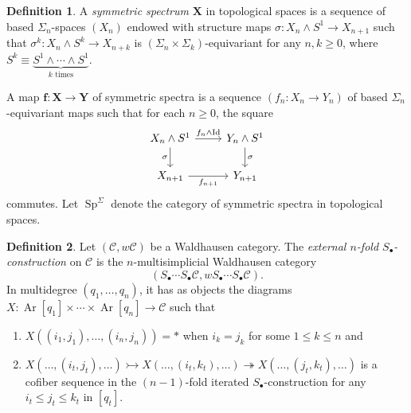 \documentclass[10pt,letterpaper,cm]{nupset}
\theoremstyle{definition}
\newtheorem{definition}{Definition}[section]
\theoremstyle{theorem}
\theoremstyle{remark}
\newcommand{\X}{\mathbf X}
\newcommand{\1}{\mathbf{1}}
\renewcommand{\c}{\mathscr{C}}
\newcommand{\0}{\vec 0}
\DeclareMathOperator{\id}{Id}
\DeclareMathOperator{\Ar}{Ar}
\DeclareMathOperator{\Sp}{Sp}
\begin{document}
\begin{definition}
 A \textit{symmetric spectrum} $\X$ in topological spaces is a sequence of based $\Sigma_n$-spaces $\left(X_n\right)$ endowed with structure maps $\sigma : X_n \land S^1 \to X_{n+1}$ such that $\sigma^k : X_n \land S^k \to X_{n+k}$ is $\left(\Sigma_{n}\times \Sigma_{k}\right)$-equivariant for any $n,k\geq 0$, where $S^k \equiv \underbrace{S^1 \land \cdots \land S^1}_{k\text{ times}}$. 
 
 \smallskip
 
 A map $\mathbf{f} : \X \to \mathbf{Y}$ of symmetric spectra is a sequence $\left(f_n : X_n \to Y_n\right)$ of based $\Sigma_n$-equivariant maps such that for each $n\geq 0$, the square
\[
\begin{tikzcd}
X_n \land S^1 \arrow[d, "\sigma"'] \arrow[r, "f_n \land \id"] & Y_n \land S^1 \arrow[d, "\sigma"] \\
X_{n+1} \arrow[r, "f_{n+1}"'] & Y_{n+1}
\end{tikzcd}
\]
commutes. Let $\Sp^{\Sigma}$ denote the category of symmetric spectra in topological spaces.
\end{definition}

\begin{definition}
Let $\left(\c,w{\c}\right)$ be a Waldhausen category. The \textit{external $n$-fold $S_{\bullet}$-construction} on $\c$ is the $n$-multisimplicial Waldhausen category $$\left(S_{\bullet}\cdots S_{\bullet}\c, wS_{\bullet} \cdots S_{\bullet} \c\right).$$ In multidegree $\left(q_1, \ldots, q_n\right)$, it has as objects the diagrams  $X: \Ar[q_1] \times \cdots \times \Ar[q_n] \to \c$ such that
\begin{enumerate}[label=(\roman*)]
\item $X((i_1, j_1), \ldots, (i_n, j_n)) = \ast$ when $i_k = j_k$ for some $1\leq k \leq n$ and
\item $X(\ldots, (i_t, j_t), \ldots) \rightarrowtail X(\ldots, (i_t, k_t), \ldots) \twoheadrightarrow X(\ldots, (j_t, k_t), \ldots)$ is a cofiber sequence  in the $\left(n-1\right)$-fold iterated $S_{\bullet}$-construction for any $i_t \leq j_t \leq k_t$ in $\left[q_t\right]$.
\end{enumerate}
\end{definition}
\end{document}
